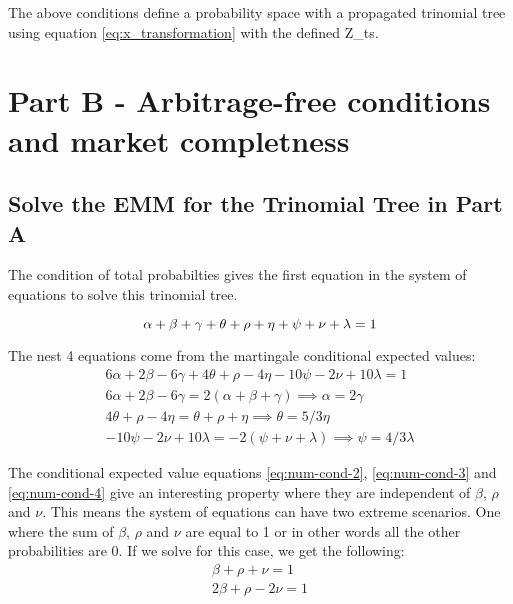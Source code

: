 \documentclass{article}
\begin{document}
The above conditions define a probability space with a propagated trinomial tree using equation \ref{eq:x_transformation} with the defined Z_ts.

\section{Part B - Arbitrage-free conditions and market completness}

\subsection{Solve the EMM for the Trinomial Tree in Part A}

The condition of total probabilties gives the first equation in the system of equations to solve this trinomial tree.

\begin{equation}
    \alpha + \beta + \gamma + \theta + \rho + \eta + \psi + \nu + \lambda = 1 \label{eq:total-prob} \\
\end{equation}

The nest 4 equations come from the martingale conditional expected values:
\begin{align}
    6\alpha + 2\beta - 6\gamma + 4\theta + \rho - 4\eta - 10\psi - 2\nu + 10\lambda = 1 \label{eq:num-cond-1} \\
    6\alpha + 2\beta - 6\gamma = 2(\alpha + \beta + \gamma) \implies \alpha = 2\gamma \label{eq:num-cond-2} \\
    4\theta + \rho - 4\eta = \theta + \rho + \eta \implies \theta = 5/3\eta \label{eq:num-cond-3} \\
    - 10\psi - 2\nu + 10\lambda = - 2(\psi + \nu + \lambda) \implies \psi = 4/3 \lambda \label{eq:num-cond-4}
\end{align}

The conditional expected value equations \ref{eq:num-cond-2}, \ref{eq:num-cond-3} and \ref{eq:num-cond-4} give an interesting property where they are independent of $\beta$, $\rho$ and $\nu$. This means the system of equations can have two extreme scenarios. One where the sum of $\beta$, $\rho$ and $\nu$ are equal to 1 or in other words all the other probabilities are 0. If we solve for this case, we get the following:
\begin{align}
    \beta + \rho + \nu = 1 \label{eq:total-prob-sub-1} \\
    2\beta  + \rho - 2\nu = 1 \label{eq:num-cond-1-sub-1}
\end{align}
\end{document}
